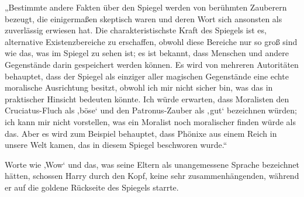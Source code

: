 „Bestimmte andere Fakten über den Spiegel werden von berühmten Zauberern bezeugt, die einigermaßen skeptisch waren und deren Wort sich ansonsten als zuverlässig erwiesen hat. Die charakteristischste Kraft des Spiegels ist es, alternative Existenzbereiche zu erschaffen, obwohl diese Bereiche nur so groß sind wie das, was im Spiegel zu sehen ist; es ist bekannt, dass Menschen und andere Gegenstände darin gespeichert werden können. Es wird von mehreren Autoritäten behauptet, dass der Spiegel als einziger aller magischen Gegenstände eine echte moralische Ausrichtung besitzt, obwohl ich mir nicht sicher bin, was das in praktischer Hinsicht bedeuten könnte. Ich würde erwarten, dass Moralisten den Cruciatus-Fluch als ‚böse‘ und den Patronus-Zauber als ‚gut‘ bezeichnen würden; ich kann mir nicht vorstellen, was ein Moralist noch moralischer finden würde als das. Aber es wird zum Beispiel behauptet, dass Phönixe aus einem Reich in unsere Welt kamen, das in diesem Spiegel beschworen wurde.“

Worte wie ‚Wow‘ und das, was seine Eltern als unangemessene Sprache bezeichnet hätten, schossen Harry durch den Kopf, keine sehr zusammenhängenden, während er auf die goldene Rückseite des Spiegels starrte.


